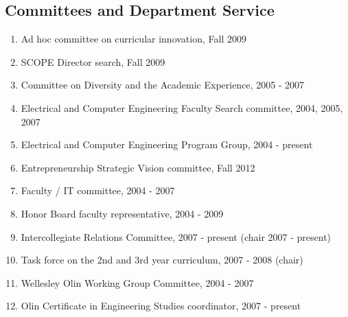 \documentclass[line]{res}
\begin{document}
\begin{resume}
	\section{\sc Committees and Department Service}
	\begin{enumerate}
		
		\item Ad hoc committee on curricular innovation, Fall 2009 
		\item SCOPE Director search, Fall 2009 
		\item Committee on Diversity and the Academic Experience, 2005 - 2007 
		\item Electrical and Computer Engineering Faculty Search committee, 2004, 2005, 2007 
		\item Electrical and Computer Engineering Program Group, 2004 - present 
		\item Entrepreneurship Strategic Vision committee, Fall 2012
		\item Faculty / IT committee, 2004 - 2007 
		\item Honor Board faculty representative, 2004 - 2009 
		\item Intercollegiate Relations Committee, 2007 - present (chair 2007 - present) 
		\item Task force on the 2nd and 3rd year curriculum, 2007 - 2008 (chair) 
		\item Wellesley Olin Working Group Committee, 2004 - 2007 
		\item Olin Certificate in Engineering Studies coordinator, 2007 - present
	\end{enumerate}
\end{resume}
\end{document}
